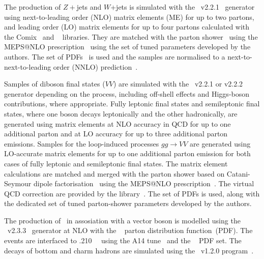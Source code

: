 \documentclass[letterpaper,12pt]{article}
\begin{document}
The production of $Z+$jets and $W$+jets is simulated with the
\sherpa~v2.2.1~\cite{Bothmann:2019yzt}
generator using next-to-leading order (NLO) matrix elements (ME) for up to two partons, and leading order (LO) matrix elements
for up to four partons calculated with the Comix~\cite{Gleisberg:2008fv}
and \openloops~\cite{Buccioni:2019sur,Cascioli:2011va,Denner:2016kdg} libraries. They
are matched with the \sherpa parton shower~\cite{Schumann:2007mg} using the MEPS@NLO
prescription~\cite{Hoeche:2011fd,Hoeche:2012yf,Catani:2001cc,Hoeche:2009rj}
using the set of tuned parameters developed by the \sherpa authors.
The \nnpdfnnlo set of PDFs~\cite{Ball:2014uwa} is used and the samples
are normalised to a next-to-next-to-leading order (NNLO)
prediction~\cite{Anastasiou:2003ds}.

Samples of diboson final states ($VV$) are simulated with the
\sherpa~v2.2.1 or v2.2.2~\cite{Bothmann:2019yzt} generator depending on the process,
including off-shell effects and Higgs-boson contributions, where appropriate.
Fully leptonic final states and semileptonic final states, where one boson
decays leptonically and the other hadronically, are generated using
matrix elements at NLO accuracy in QCD for up to one additional parton
and at LO accuracy for up to three additional parton
emissions. Samples for the loop-induced processes $gg \to VV$ are
generated using LO-accurate matrix elements for up to one
additional parton emission for both cases of fully leptonic and
semileptonic final states. The matrix element calculations are matched
and merged with the \sherpa parton shower based on Catani-Seymour
dipole factorisation~\cite{Gleisberg:2008fv,Schumann:2007mg} using the MEPS@NLO
prescription~\cite{Hoeche:2011fd,Hoeche:2012yf,Catani:2001cc,Hoeche:2009rj}.
The virtual QCD correction are provided by the
\openloops library~\cite{Buccioni:2019sur,Cascioli:2011va,Denner:2016kdg}. The
\nnpdfnnlo set of PDFs is used, %
along with the dedicated set of tuned parton-shower parameters developed by the
\sherpa authors.

The production of \ttbar\ in assosiation with a vector boson 
is modelled using the
\mgamc~v2.3.3~\cite{Alwall:2014hca} generator at NLO with the
\nnpdfnlo~\cite{Ball:2014uwa} parton distribution function~(PDF).
The events are interfaced to \pythia.210~\cite{Sjostrand:2014zea}~
using the A14 tune~\cite{ATL-PHYS-PUB-2014-021} and the
\nnpdftwo~\cite{Ball:2014uwa} PDF set. The decays of bottom and charm
hadrons are simulated using the \evtgen\ v1.2.0 program~\cite{Lange:2001uf}.
\end{document}
